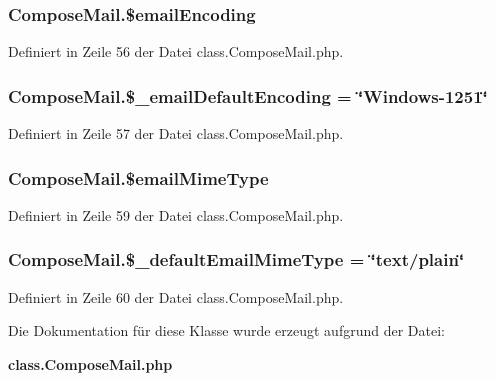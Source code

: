 \subsubsection{\setlength{\rightskip}{0pt plus 5cm}ComposeMail.\$emailEncoding}\label{classComposeMail_662fada1d461238687c56cd64baa7087}




Definiert in Zeile 56 der Datei class.ComposeMail.php.
\subsubsection{\setlength{\rightskip}{0pt plus 5cm}ComposeMail.\$\_\-emailDefaultEncoding = \char`\"{}Windows-1251\char`\"{}}\label{classComposeMail_c6ba4b1d5749585e8b8d9dad92eb75a0}




Definiert in Zeile 57 der Datei class.ComposeMail.php.
\subsubsection{\setlength{\rightskip}{0pt plus 5cm}ComposeMail.\$emailMimeType}\label{classComposeMail_154077bcd48eb6499cbdd2e35b027488}




Definiert in Zeile 59 der Datei class.ComposeMail.php.
\subsubsection{\setlength{\rightskip}{0pt plus 5cm}ComposeMail.\$\_\-defaultEmailMimeType = \char`\"{}text/plain\char`\"{}}\label{classComposeMail_cf760abbc8ab73e04df9d3f7ae0abcb7}




Definiert in Zeile 60 der Datei class.ComposeMail.php.

Die Dokumentation für diese Klasse wurde erzeugt aufgrund der Datei:\begin{CompactItemize}
\item 
{\bf class.ComposeMail.php}\end{CompactItemize}
